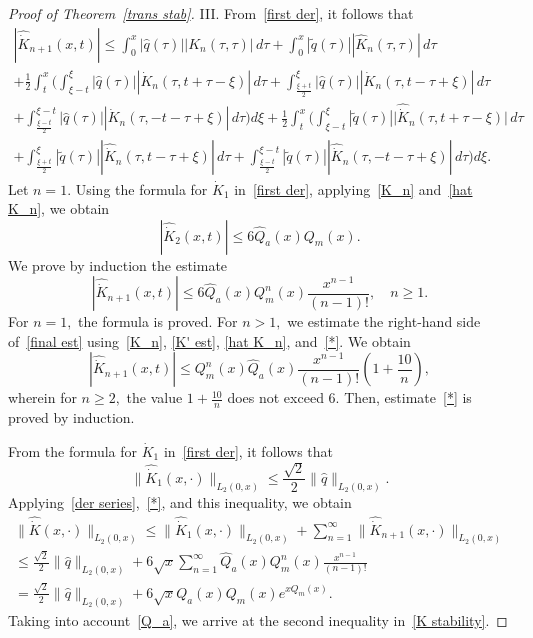 \documentclass[a4paper, 12pt] {article}
\theoremstyle{plain}
\theoremstyle{remark}
\theoremstyle{plain}
\theoremstyle{definition}
\numberwithin{equation}{section}
\begin{document}
\begin{proof}[Proof of Theorem~\ref{trans stab}]
III. From~\eqref{first der}, it follows that
\begin{equation} \label{final est}
\begin{split}
|\hat {\dot K}_{n+1}(x, t)|  \le  \int_0^{x} |\hat q(\tau)| |K_n(\tau, \tau)| \,d\tau 
+ \int_0^{x} |\tilde q(\tau)| |\hat K_n(\tau, \tau)| \,d\tau 
\\
+\frac12\int_t^x \Bigg(\int_{\xi-t}^\xi |\hat q(\tau)||\dot K_n(\tau, t+\tau-\xi)|\,d\tau +
\int_{\frac{\xi+t}{2}}^\xi |\hat q(\tau)||\dot K_n(\tau, t-\tau+\xi)|\,d\tau \\
+\int_{\frac{\xi-t}{2}}^{\xi-t} |\hat q(\tau)||\dot K_n(\tau, -t-\tau+\xi)|\,d\tau\Bigg)d\xi 
+\frac12\int_t^x \Bigg(\int_{\xi-t}^\xi |\tilde q(\tau)|\big|\hat{\dot K}_n(\tau, t+\tau-\xi)\big|\,d\tau \\
+\int_{\frac{\xi+t}{2}}^\xi |\tilde q(\tau)||\hat{\dot K}_n(\tau, t-\tau+\xi)|\,d\tau+\int_{\frac{\xi-t}{2}}^{\xi-t} |\tilde q(\tau)||\hat{\dot K}_n(\tau, -t-\tau+\xi)|\,d\tau\Bigg)d\xi.
\end{split}
\end{equation}
Let $n=1.$
Using the formula for $\dot K_1$ in~\eqref{first der}, applying~\eqref{K_n} and~\eqref{hat K_n}, we obtain
\begin{equation*} \label{base}
|\hat{\dot K}_2(x, t)| \le 6 \hat Q_a(x) Q_{m}(x).
\end{equation*}
We prove by induction the estimate
\begin{equation} \label{*}
|\hat{\dot K}_{n+1}(x, t)| \le 6 \hat{Q}_a(x) Q_{m}^{n}(x) \frac{x^{n-1}}{(n-1)!}, \quad n \ge 1.
\end{equation}
For $n=1,$ the formula is proved. For $n > 1,$ we estimate the right-hand side of~\eqref{final est} using~\eqref{K_n}, \eqref{K' est}, \eqref{hat K_n}, and~\eqref{*}. We obtain
$$ |\hat{\dot K}_{n+1}(x, t)| \le Q_{m}^n(x) \hat{Q}_a(x) \frac{x^{n-1}}{(n-1)!} \left(1 + \frac{10}{n}\right),$$
wherein for $n \ge 2,$ the value $1 + \frac{10}{n}$ does not exceed $6.$ Then, estimate~\eqref{*} is proved by induction. 

From the formula for $\dot{K}_1$ in~\eqref{first der},  it follows that
$$\| \hat {\dot K}_1(x, \cdot)\|_{L_2(0, x)} \le \frac{\sqrt 2}{2}\| \hat q\|_{L_2(0, x)}.$$
Applying~\eqref{der series},~\eqref{*}, and this inequality, we obtain
\begin{equation*}
\begin{split}
\|\hat{\dot K}(x, \cdot)\|_{L_2(0, x)} \le \big\| \hat{\dot K}_1(x, \cdot) \big\|_{L_2(0,x)} + \sum_{n=1}^\infty \big\| \hat{\dot K}_{n+1}(x, \cdot) \big\|_{L_2(0,x)}
\\
\le  \frac{\sqrt2}{2}\| \hat q\|_{L_2(0, x)} + 6\sqrt x \sum_{n=1}^\infty \hat Q_a(x) Q^n_{m}(x) \frac{x^{n-1}}{(n-1)!}\\
= \frac{\sqrt2}{2}\| \hat q\|_{L_2(0, x)} + 6\sqrt xQ_a(x) Q_{m}(x) e^{x Q_m(x)}.
\end{split}
\end{equation*}
Taking into account~\eqref{Q_a}, we arrive at the second inequality in~\eqref{K stability}.
\end{proof}
\end{document}
